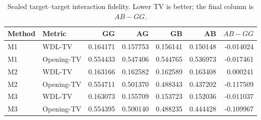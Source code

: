 \begin{table}[t]
\centering
\caption{Sealed target--target interaction fidelity. Lower TV is better; the final column is $AB-GG$.}
\label{tab:pairwise-main}
\begin{tabular}{llrrrrr}
\toprule
Method & Metric & GG & AG & GB & AB & $AB-GG$ \\
\midrule
M1 & WDL-TV & 0.164171 & 0.157753 & 0.156141 & 0.150148 & -0.014024 \\
M1 & Opening-TV & 0.554433 & 0.547406 & 0.544765 & 0.536973 & -0.017461 \\
M2 & WDL-TV & 0.163166 & 0.162582 & 0.162589 & 0.163408 & 0.000241 \\
M2 & Opening-TV & 0.554711 & 0.501370 & 0.488343 & 0.437202 & -0.117509 \\
M3 & WDL-TV & 0.163073 & 0.155709 & 0.153723 & 0.152036 & -0.011037 \\
M3 & Opening-TV & 0.554395 & 0.500140 & 0.488235 & 0.444428 & -0.109967 \\
\bottomrule
\end{tabular}
\end{table}
